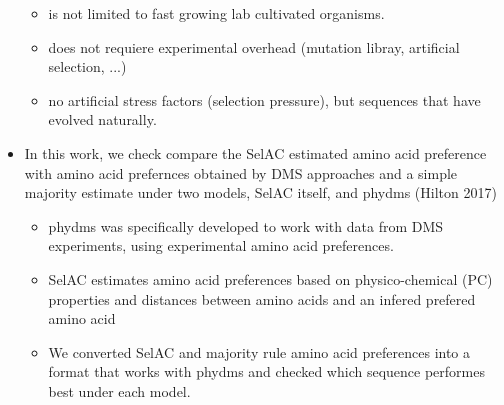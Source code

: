 \documentclass[12pt]{article}
\begin{document}
\begin{itemize}
\begin{itemize}
		\item is not limited to fast growing lab cultivated organisms.
		\item does not requiere experimental overhead (mutation libray, artificial selection, ...)
		\item no artificial stress factors (selection pressure), but sequences that have evolved naturally.
	\end{itemize}
	\item In this work, we check compare the SelAC estimated amino acid preference with amino acid prefernces obtained by DMS approaches and a simple majority estimate under two models, SelAC itself, and phydms (Hilton 2017)
	\begin{itemize}
		\item phydms was specifically developed to work with data from DMS experiments, using experimental amino acid preferences.
		\item SelAC estimates amino acid preferences based on physico-chemical (PC) properties and distances between amino acids and an infered prefered amino acid
		\item We converted SelAC and majority rule amino acid preferences into a format that works with phydms and checked which sequence performes best under each model.
	\end{itemize}
\end{itemize}
\end{document}

